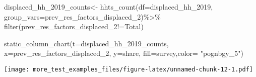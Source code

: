 \documentclass[
]{article}
\newenvironment{Shaded}{\begin{snugshade}}{\end{snugshade}}
\newcommand{\AttributeTok}[1]{\textcolor[rgb]{0.77,0.63,0.00}{#1}}
\newcommand{\FunctionTok}[1]{\textcolor[rgb]{0.00,0.00,0.00}{#1}}
\newcommand{\NormalTok}[1]{#1}
\newcommand{\OtherTok}[1]{\textcolor[rgb]{0.56,0.35,0.01}{#1}}
\newcommand{\SpecialCharTok}[1]{\textcolor[rgb]{0.00,0.00,0.00}{#1}}
\newcommand{\StringTok}[1]{\textcolor[rgb]{0.31,0.60,0.02}{#1}}
\begin{document}
\begin{Shaded}
\begin{Highlighting}[]
\NormalTok{displaced\_hh\_2019\_counts}\OtherTok{\textless{}{-}} \FunctionTok{hhts\_count}\NormalTok{(}\AttributeTok{df=}\NormalTok{displaced\_hh\_2019, }\AttributeTok{group\_vars=}\StringTok{\textquotesingle{}prev\_res\_factors\_displaced\_2\textquotesingle{}}\NormalTok{)}\SpecialCharTok{\%\textgreater{}\%}
\FunctionTok{filter}\NormalTok{(prev\_res\_factors\_displaced\_2}\SpecialCharTok{!=}\StringTok{\textquotesingle{}Total\textquotesingle{}}\NormalTok{)}

\FunctionTok{static\_column\_chart}\NormalTok{(}\AttributeTok{t=}\NormalTok{displaced\_hh\_2019\_counts, }\AttributeTok{x=}\StringTok{\textquotesingle{}prev\_res\_factors\_displaced\_2\textquotesingle{}}\NormalTok{, }\AttributeTok{y=}\StringTok{\textquotesingle{}share\textquotesingle{}}\NormalTok{, }\AttributeTok{fill=}\StringTok{\textquotesingle{}survey\textquotesingle{}}\NormalTok{,}\AttributeTok{color=}  \StringTok{"pognbgy\_5"}\NormalTok{)}
\end{Highlighting}
\end{Shaded}

\texttt{[image: more\_test\_examples\_files/figure-latex/unnamed-chunk-12-1.pdf]}
\end{document}
